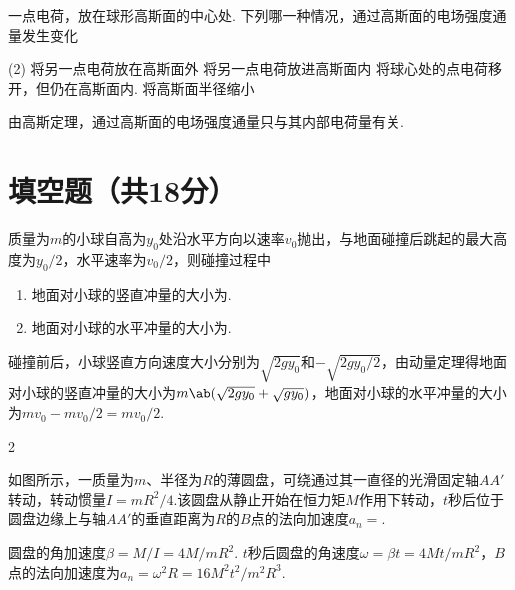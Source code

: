 \begin{problem}
    一点电荷，放在球形高斯面的中心处. 下列哪一种情况，通过高斯面的电场强度通量发生变化
    \begin{tasks}(2)
        \task 将另一点电荷放在高斯面外
        \task[\true] 将另一点电荷放进高斯面内
        \task 将球心处的点电荷移开，但仍在高斯面内.
        \task 将高斯面半径缩小
    \end{tasks}
\end{problem}
\begin{solution}
    由高斯定理，通过高斯面的电场强度通量只与其内部电荷量有关.
\end{solution}

\section{填空题（共18分）}

\begin{problem}
    质量为$m$的小球自高为$y_0$处沿水平方向以速率$v_0$抛出，与地面碰撞后跳起的最大高度为$y_0/2$，水平速率为$v_0/2$，则碰撞过程中
    \begin{enumerate}
        \item 地面对小球的竖直冲量的大小为.
        \item 地面对小球的水平冲量的大小为.
    \end{enumerate}
\end{problem}
\begin{solution}
    碰撞前后，小球竖直方向速度大小分别为$\sqrt{2gy_0}$和$-\sqrt{2gy_0/2}$，由动量定理得地面对小球的竖直冲量的大小为$m\ab(\sqrt{2gy_0}+\sqrt{gy_0})$，地面对小球的水平冲量的大小为$mv_0-mv_0/2=mv_0/2$.
\end{solution}

\begin{paracol}{2}
\begin{problem} %
    如图所示，一质量为$m$、半径为$R$的薄圆盘，可绕通过其一直径的光滑固定轴$AA'$转动，转动惯量$I=mR^2/4$.该圆盘从静止开始在恒力矩$M$作用下转动，$t$秒后位于圆盘边缘上与轴$AA'$的垂直距离为$R$的$B$点的法向加速度$a_n=$.
    \switchcolumn\vspace*{\fill}\centering
    \vspace*{\fill}
\end{problem}
\end{paracol}
\begin{solution}
    圆盘的角加速度$\beta=M/I=4M/mR^2$. $t$秒后圆盘的角速度$\omega=\beta t=4Mt/mR^2$，$B$点的法向加速度为$a_n=\omega^2R=16M^2t^2/m^2R^3$.
\end{solution}

